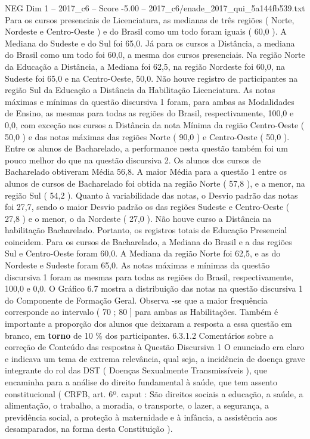 \begin{textsample}{NEG Dim 1 – 2017\_c6 – Score -5.00 – 2017\_c6/enade\_2017\_qui\_5a144fb539.txt}
Para os cursos presenciais de Licenciatura, as medianas de três regiões ( Norte, Nordeste e Centro-Oeste ) e do Brasil como um todo foram iguais ( 60,0 ).
A Mediana do Sudeste e do Sul foi 65,0.
Já para os cursos a Distância, a mediana do Brasil como um todo foi 60,0, a mesma dos cursos presenciais.
Na região Norte da Educação a Distância, a Mediana foi 62,5, na região Nordeste foi 60,0, na Sudeste foi 65,0 e na Centro-Oeste, 50,0.
Não houve registro de participantes na região Sul da Educação a Distância da Habilitação Licenciatura.
As notas máximas e mínimas da questão discursiva 1 foram, para ambas as Modalidades de Ensino, as mesmas para todas as regiões do Brasil, respectivamente, 100,0 e 0,0, com exceção nos cursos a Distância da nota Mínima da região Centro-Oeste ( 50,0 ) e das notas máximas das regiões Norte ( 90,0 ) e Centro-Oeste ( 50,0 ).
Entre os alunos de Bacharelado, a performance nesta questão também foi um pouco melhor do que na questão discursiva 2.
Os alunos dos cursos de Bacharelado obtiveram Média 56,8.
A maior Média para a questão 1 entre os alunos de cursos de Bacharelado foi obtida na região Norte ( 57,8 ), e a menor, na região Sul ( 54,2 ).
Quanto à variabilidade das notas, o Desvio padrão das notas foi 27,7, sendo o maior Desvio padrão os das regiões Sudeste e Centro-Oeste ( 27,8 ) e o menor, o da Nordeste ( 27,0 ).
Não houve curso a Distância na habilitação Bacharelado.
Portanto, os registros totais de Educação Presencial coincidem.
Para os cursos de Bacharelado, a Mediana do Brasil e a das regiões Sul e Centro-Oeste foram 60,0.
A Mediana da região Norte foi 62,5, e as do Nordeste e Sudeste foram 65,0.
As notas máximas e mínimas da questão discursiva 1 foram as mesmas para todas as regiões do Brasil, respectivamente, 100,0 e 0,0.
O Gráfico 6.7 mostra a distribuição das notas na questão discursiva 1 do Componente de Formação Geral.
Observa -se que a maior frequência corresponde ao intervalo ( 70 ; 80 ] para ambas as Habilitações.
Também é importante a proporção dos alunos que deixaram a resposta a essa questão em branco, em \textbf{torno} de 10 \% dos participantes. 6.3.1.2 Comentários sobre a correção de Conteúdo das respostas à Questão Discursiva 1 O enunciado era claro e indicava um tema de extrema relevância, qual seja, a incidência de doença grave integrante do rol das DST ( Doenças Sexualmente Transmissíveis ), que encaminha para a análise do direito fundamental à saúde, que tem assento constitucional ( CRFB, art. 6º. caput : São direitos sociais a educação, a saúde, a alimentação, o trabalho, a moradia, o transporte, o lazer, a segurança, a previdência social, a proteção à maternidade e à infância, a assistência aos desamparados, na forma desta Constituição ).

\end{textsample}
